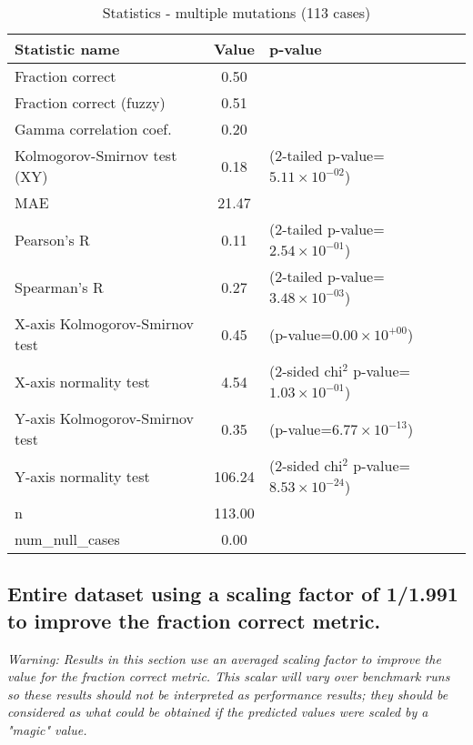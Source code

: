 \documentclass[10pt, letterpaper, oneside, titlepage, landscape]{scrreprt}
\begin{document}
\begin{table}[H]\begin{center}
\begin{tabular}{ l S[table-format=3.2] l}
Statistic name & {Value} & p-value\\
\hline
Fraction correct & 0.50 & \\
Fraction correct (fuzzy) & 0.51 & \\
Gamma correlation coef. & 0.20 & \\
Kolmogorov-Smirnov test (XY) & 0.18 & (2-tailed p-value=$5.11\times10^{-02}$)\\
MAE & 21.47 & \\
Pearson's R & 0.11 & (2-tailed p-value=$2.54\times10^{-01}$)\\
Spearman's R & 0.27 & (2-tailed p-value=$3.48\times10^{-03}$)\\
X-axis Kolmogorov-Smirnov test & 0.45 & (p-value=$0.00\times10^{+00}$)\\
X-axis normality test & 4.54 & (2-sided chi$^{2}$ p-value=$1.03\times10^{-01}$)\\
Y-axis Kolmogorov-Smirnov test & 0.35 & (p-value=$6.77\times10^{-13}$)\\
Y-axis normality test & 106.24 & (2-sided chi$^{2}$ p-value=$8.53\times10^{-24}$)\\
n & 113.00 & \\
num\_null\_cases & 0.00 & \\
\end{tabular}
\caption{Statistics - multiple mutations (113 cases)}
\end{center}\end{table}


\subsection{Entire dataset using a scaling factor of 1/1.991 to improve the fraction correct metric.}
\textit{Warning: Results in this section use an averaged scaling factor to improve the value for the fraction correct metric. This scalar will vary over benchmark runs so these results should not be interpreted as performance results; they should be considered as what could be obtained if the predicted values were scaled by a "magic" value.}
\end{document}
